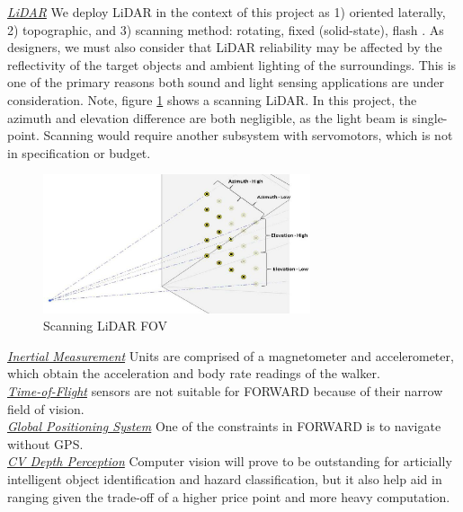 \noindent \underline{\textit{LiDAR}} We deploy LiDAR in the context of this project as 1) oriented laterally, 2) topographic, and 3) scanning method: rotating, fixed (solid-state), flash \cite{lidar-type}. As designers, we must also consider that LiDAR reliability may be affected by the reflectivity of the target objects and ambient lighting of the surroundings. This is one of the primary reasons both sound and light sensing applications are under consideration. Note, figure \ref{fig:lidarazimuth} shows a scanning LiDAR. In this project, the azimuth and elevation difference are both negligible, as the light beam is single-point. Scanning would require another subsystem with servomotors, which is not in specification or budget.\\

\begin{figure}[h]
	\centering
	\includegraphics[width=0.7\textwidth]{./Images/FOV-scanning-LIDAR.png}
	\caption{\label{fig:lidarazimuth}Scanning LiDAR FOV \cite{coolLiDARfov}}
\end{figure}

\noindent \underline{\textit{Inertial Measurement}} Units are comprised of a magnetometer and accelerometer, which obtain the acceleration and body rate readings of the walker.\\

\noindent \underline{\textit{Time-of-Flight}} sensors are not suitable for FORWARD because of their narrow field of vision.\\

\noindent \underline{\textit{Global Positioning System}} One of the constraints in FORWARD is to navigate without GPS.\\

\noindent \underline{\textit{CV Depth Perception}} Computer vision will prove to be outstanding for articially intelligent object identification and hazard classification, but it also help aid in ranging given the trade-off of a higher price point and more heavy computation.\\

